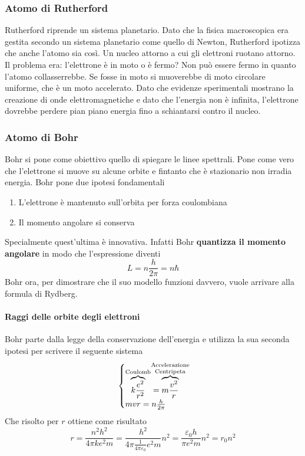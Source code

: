 \subsubsection{Atomo di Rutherford}
Rutherford riprende un sistema planetario. Dato che la fisica macroscopica era gestita secondo un
sistema planetario come quello di Newton, Rutherford ipotizza che anche l'atomo sia così. Un nucleo
attorno a cui gli elettroni ruotano attorno. Il problema era: l'elettrone è in moto o è fermo?
Non può essere fermo in quanto l'atomo collasserrebbe. Se fosse in moto si muoverebbe di moto 
circolare uniforme, che è un moto accelerato. Dato che evidenze sperimentali mostrano la creazione di
onde elettromagnetiche e dato che l'energia non è infinita, l'elettrone dovrebbe perdere pian piano
energia fino a schiantarsi contro il nucleo.
\subsubsection{Atomo di Bohr}
Bohr si pone come obiettivo quello di spiegare le linee spettrali. Pone come vero che l'elettrone si
muove su alcune orbite e fintanto che è stazionario non irradia energia. Bohr pone due ipotesi 
fondamentali
\begin{enumerate}
  \item L'elettrone è mantenuto sull'orbita per forza coulombiana
  \item Il momento angolare si conserva
\end{enumerate}
Specialmente quest'ultima è innovativa. Infatti Bohr \textbf{quantizza il momento angolare} in modo
che l'espressione diventi
\begin{equation*}
  L = n \frac{h}{2\pi} = n\hbar
\end{equation*}
Bohr ora, per dimostrare che il suo modello funzioni davvero, vuole arrivare alla formula di Rydberg.
\paragraph{Raggi delle orbite degli elettroni}
Bohr parte dalla legge della conservazione dell'energia e utilizza la sua seconda ipotesi per 
scrivere il seguente sistema
\begin{equation*}
  \begin{cases}
    \overbrace{k \frac{e^2}{r^2}}^{\text{Coulomb}}=
    \overbrace{m \frac{v^2}{r}}^{\mathclap{\text{\parbox{4cm}{\centering Accelerazione\\[-4pt]
    Centripeta}}}}\\
    mvr=n \frac{h}{2\pi}
  \end{cases}
\end{equation*}
Che risolto per $r$ ottiene come risultato
\begin{equation*}
  r = \frac{n^2h^2}{4\pi ke^2m} = \frac{h^2}{4\pi \frac{1}{4\pi\varepsilon_0}e^2m}n^2=
  \frac{\varepsilon_0h}{\pi e^2m}n^2 = r_0 n^2
\end{equation*}
